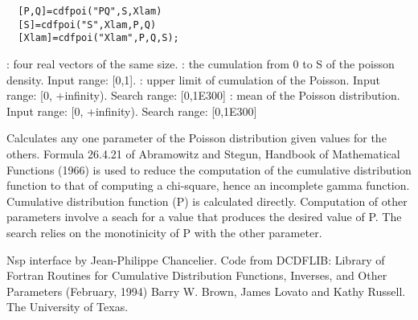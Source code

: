 \begin{mandesc}
\end{mandesc}
\label{cdfpoi}
\begin{calling_sequence}
\begin{verbatim}
  [P,Q]=cdfpoi("PQ",S,Xlam)  
  [S]=cdfpoi("S",Xlam,P,Q)  
  [Xlam]=cdfpoi("Xlam",P,Q,S);  
\end{verbatim}
\end{calling_sequence}
\begin{parameters}
  \begin{varlist}
    : four real vectors of the same size.
    :  the cumulation from 0 to S of the poisson density. Input range: [0,1].
    : upper limit of cumulation of the Poisson. Input range: [0, +infinity). Search range: [0,1E300]
      : mean of the Poisson distribution. Input range: [0, +infinity). Search range: [0,1E300]
  \end{varlist}
\end{parameters}
\begin{mandescription}
  Calculates any one parameter of the Poisson
  distribution given values for the others.
  Formula   26.4.21  of   Abramowitz  and   Stegun,   Handbook  of
  Mathematical Functions (1966) is used  to reduce the computation
  of  the cumulative distribution function to that  of computing a
  chi-square, hence an incomplete gamma function.
  Cumulative  distribution function  (P) is  calculated  directly.
  Computation of other parameters involve a seach for a value that
  produces  the desired value of  P.   The  search relies  on  the
  monotinicity of P with the other parameter.
\end{mandescription}

\begin{authors}
  Nsp interface by Jean-Philippe Chancelier. Code from DCDFLIB: 
  Library of Fortran Routines for Cumulative Distribution
  Functions, Inverses, and Other Parameters (February, 1994)
  Barry W. Brown, James Lovato and Kathy Russell. The University of Texas.
\end{authors}
